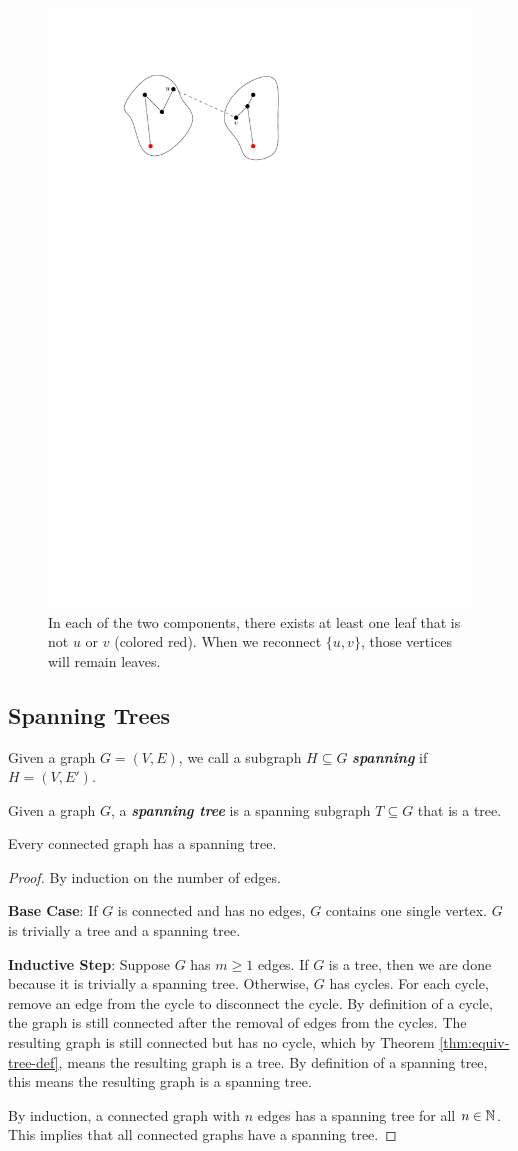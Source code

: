 \begin{figure}[htbp]
    \centering
    \includegraphics[width=0.4\linewidth]{figures/pendant-vertex-cycle.pdf}
    \caption{In each of the two components, there exists at least one leaf that is not $u$ or $v$ (colored red). When we reconnect $\{u,v\}$, those vertices will remain leaves.}
    \label{fig:pendant-vertex}
\end{figure}

\subsection{Spanning Trees}

\begin{definition}
    Given a graph $G = (V,E)$, we call a subgraph $H \subseteq G$ \textit{\textbf{spanning}} if $H = (V,E')$.
\end{definition}

\begin{definition}
    Given a graph $G$, a \textit{\textbf{spanning tree}} is a spanning subgraph $T \subseteq G$ that is a tree.
\end{definition}

\begin{theorem}
    Every connected graph has a spanning tree.
\end{theorem}

\begin{proof}
    By induction on the number of edges.

    \textbf{Base Case}: If $G$ is connected and has no edges, $G$ contains one single vertex. $G$ is trivially a tree and a spanning tree.

    \textbf{Inductive Step}: Suppose $G$ has $m \geq 1$ edges. If $G$ is a tree, then we are done because it is trivially a spanning tree. Otherwise, $G$ has cycles. For each cycle, remove an edge from the cycle to disconnect the cycle. By definition of a cycle, the graph is still connected after the removal of edges from the cycles. The resulting graph is still connected but has no cycle, which by Theorem \ref{thm:equiv-tree-def}, means the resulting graph is a tree. By definition of a spanning tree, this means the resulting graph is a spanning tree.

    By induction, a connected graph with $n$ edges has a spanning tree for all $n \in \mathbb{N}$. This implies that all connected graphs have a spanning tree.
\end{proof}